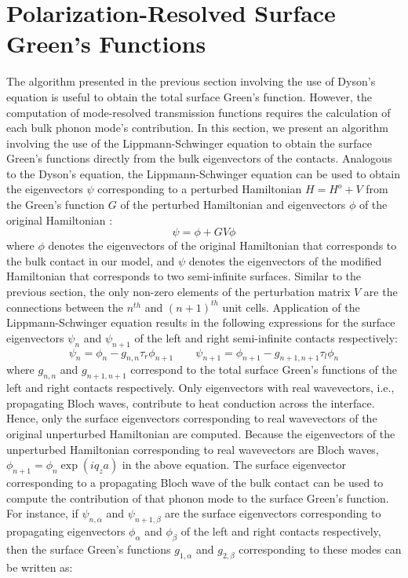 \documentclass[11pt]{article}
\begin{document}
\section{Polarization-Resolved Surface Green's Functions}
\label{pol_g}
The algorithm presented in the previous section involving the use of Dyson's equation is useful to obtain the total surface Green's function. However, the computation of mode-resolved transmission functions requires the calculation of each bulk phonon mode's contribution. In this section, we present an algorithm involving the use of the Lippmann-Schwinger equation to obtain the surface Green's functions directly from the bulk eigenvectors of the contacts. Analogous to the Dyson's equation, the Lippmann-Schwinger equation can be used to obtain the eigenvectors $\psi$ corresponding to a perturbed Hamiltonian $H=H^o+V$ from the Green's function $G$ of the perturbed Hamiltonian and eigenvectors $\phi$ of the original Hamiltonian \cite{mingo2009green}:
\begin{equation}
\psi = \phi+GV\phi
\end{equation}
where $\phi$ denotes the eigenvectors of the original Hamiltonian that corresponds to the bulk contact in our model, and $\psi$ denotes the eigenvectors of the modified Hamiltonian that corresponds to two semi-infinite surfaces. Similar to the previous section, the only non-zero elements of the perturbation matrix $V$ are the connections between the $n^{th}$ and $(n+1)^{th}$ unit cells. Application of the Lippmann-Schwinger equation results in the following expressions for the surface eigenvectors $\psi_{n}$ and $\psi_{n+1}$ of the left and right semi-infinite contacts respectively:
\begin{equation}
\psi_n = \phi_n-g_{n,n}\tau_r\phi_{n+1} \qquad \psi_{n+1} = \phi_{n+1}-g_{n+1,n+1}\tau_l\phi_{n}
\end{equation}
where $g_{n,n}$ and $g_{n+1,n+1}$ correspond to the total surface Green's functions of the left and right contacts respectively. Only eigenvectors with real wavevectors, i.e., propagating Bloch waves, contribute to heat conduction across the interface. Hence, only the surface eigenvectors corresponding to real wavevectors of the original unperturbed Hamiltonian are computed. Because the eigenvectors of the unperturbed Hamiltonian corresponding to real wavevectors are Bloch waves, $\phi_{n+1} = \phi_n\exp{(iq_za)}$ in the above equation. The surface eigenvector corresponding to a propagating Bloch wave of the bulk contact can be used to compute the contribution of that phonon mode to the surface Green's function. For instance, if $\psi_{n,\alpha}$ and $\psi_{n+1,\beta}$ are the surface eigenvectors corresponding to propagating eigenvectors $\phi_\alpha$ and $\phi_\beta$ of the left and right contacts respectively, then the surface Green's functions $g_{1,\alpha}$ and $g_{2,\beta}$ corresponding to these modes can be written as:
\end{document}
